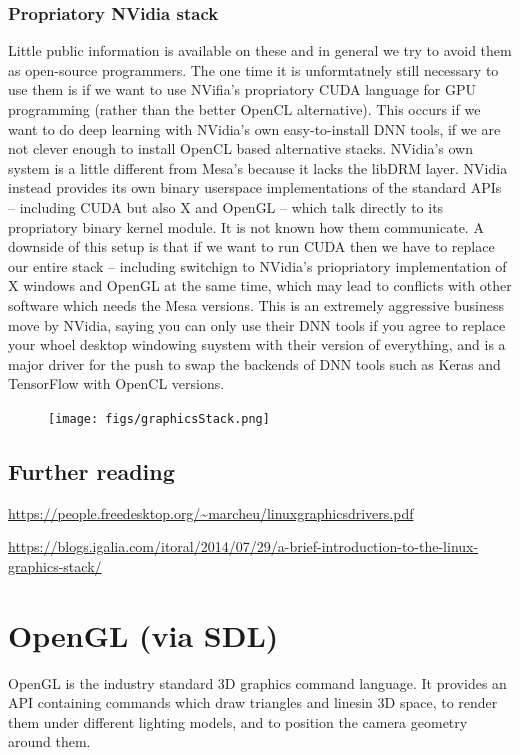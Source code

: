 \documentclass[oneside,english]{scrbook}
\begin{document}
\subsection{Propriatory NVidia stack}
Little public information is available on these and in general we try to avoid them as open-source programmers.   The one time it is unformtatnely still necessary to use them is if we want to use NVifia's propriatory CUDA language for GPU programming (rather than the better OpenCL alternative).  This occurs if we want to do deep learning with NVidia's own easy-to-install DNN tools, if we are not clever enough to install OpenCL based alternative stacks.   NVidia's own system is a little different from Mesa's because it lacks the libDRM layer.  NVidia instead provides its own binary userspace implementations of the standard APIs -- including CUDA but also X and OpenGL -- which talk directly to its propriatory binary kernel module.  It is not known how them communicate.   A downside of this setup is that if we want to run CUDA then we have to replace our entire stack -- including switchign to NVidia's priopriatory implementation of X windows and OpenGL at the same time, which may lead to conflicts with other software which needs the Mesa versions.  This is an extremely aggressive business move by NVidia, saying you can only use their DNN tools if you agree to replace your whoel desktop windowing suystem with their version of everything, and is a major driver for the push to swap the backends of DNN tools such as Keras and TensorFlow with OpenCL versions.  




\begin{figure}
	\caption{}
	\texttt{[image: figs/graphicsStack.png]}
\end{figure}

\section{Further reading}
\url{https://people.freedesktop.org/~marcheu/linuxgraphicsdrivers.pdf}

\url{https://blogs.igalia.com/itoral/2014/07/29/a-brief-introduction-to-the-linux-graphics-stack/}


\chapter{OpenGL (via SDL)}

OpenGL is the industry standard 3D graphics command language.  It provides an API containing commands which draw triangles and linesin 3D space, to render them under different lighting models, and to position the camera geometry around them.
\end{document}
